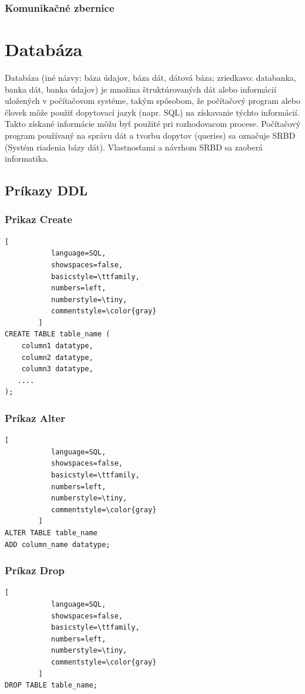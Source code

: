 \subsubsection{Komunikačné zbernice}
\section{Databáza}
Databáza (iné názvy: báza údajov, báza dát, dátová báza; zriedkavo: databanka, banka dát, banka údajov) je množina štruktúrovaných dát alebo informácií uložených v počítačovom systéme, takým spôsobom, že počítačový program alebo človek môže použiť dopytovací jazyk (napr. \acs{SQL}) na získavanie týchto informácií. Takto získané informácie môžu byť použité pri rozhodovacom procese. Počítačový program používaný na správu dát a tvorbu dopytov (queries) sa označuje SRBD (Systém riadenia bázy dát). Vlastnosťami a návrhom SRBD sa zaoberá informatika.

\subsection{Príkazy \acl{DDL}}

\subsubsection{Prikaz Create}

\begin{lstlisting}[
           language=SQL,
           showspaces=false,
           basicstyle=\ttfamily,
           numbers=left,
           numberstyle=\tiny,
           commentstyle=\color{gray}           
        ]
CREATE TABLE table_name (
    column1 datatype,
    column2 datatype,
    column3 datatype,
   ....
);
\end{lstlisting}


\subsubsection{Príkaz Alter}
\begin{lstlisting}[
           language=SQL,
           showspaces=false,
           basicstyle=\ttfamily,
           numbers=left,
           numberstyle=\tiny,
           commentstyle=\color{gray}           
        ]
ALTER TABLE table_name
ADD column_name datatype;

\end{lstlisting}
\subsubsection{Príkaz Drop}
\begin{lstlisting}[
           language=SQL,
           showspaces=false,
           basicstyle=\ttfamily,
           numbers=left,
           numberstyle=\tiny,
           commentstyle=\color{gray}           
        ]
DROP TABLE table_name;

\end{lstlisting}


